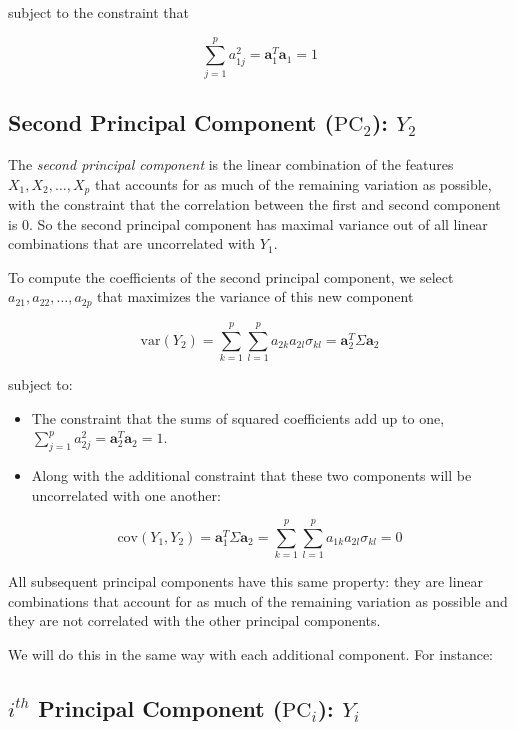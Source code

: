 \documentclass[]{book}
\begin{document}
subject to the constraint that

\[ \sum_{j=1}^{p}a^2_{1j} = \mathbf{a}^T_1\mathbf{a}_1   = 1 \]

\subsection*{\texorpdfstring{Second Principal Component
(\(\text{PC}_2\)):
\(Y_2\)}{Second Principal Component (\textbackslash{}text\{PC\}\_2): Y\_2}}\label{second-principal-component-textpc_2-y_2}

The \emph{second principal component} is the linear combination of the
features \(X_1,X_2,\ldots,X_p\) that accounts for as much of the
remaining variation as possible, with the constraint that the
correlation between the first and second component is 0. So the second
principal component has maximal variance out of all linear combinations
that are uncorrelated with \(Y_1\).

To compute the coefficients of the second principal component, we select
\(a_{21},a_{22},\ldots,a_{2p}\) that maximizes the variance of this new
component

\[\text{var}(Y_2) = \sum_{k=1}^{p}\sum_{l=1}^{p}a_{2k}a_{2l}\sigma_{kl} = \mathbf{a}^T_2\Sigma\mathbf{a}_2 \]

subject to:

\begin{itemize}
\item
  The constraint that the sums of squared coefficients add up to one,
  \(\sum_{j=1}^{p}a^2_{2j} = \mathbf{a}^T_2\mathbf{a}_2 = 1\).
\item
  Along with the additional constraint that these two components will be
  uncorrelated with one another:
\end{itemize}

\[ \text{cov}(Y_1, Y_2) = \mathbf{a}^T_1\Sigma\mathbf{a}_2  = \sum_{k=1}^{p}\sum_{l=1}^{p}a_{1k}a_{2l}\sigma_{kl} = 0 \]

All subsequent principal components have this same property: they are
linear combinations that account for as much of the remaining variation
as possible and they are not correlated with the other principal
components.

We will do this in the same way with each additional component. For
instance:

\subsection*{\texorpdfstring{\(i^{th}\) Principal Component
(\(\text{PC}_i\)):
\(Y_i\)}{i\^{}\{th\} Principal Component (\textbackslash{}text\{PC\}\_i): Y\_i}}\label{ith-principal-component-textpc_i-y_i}
\end{document}
